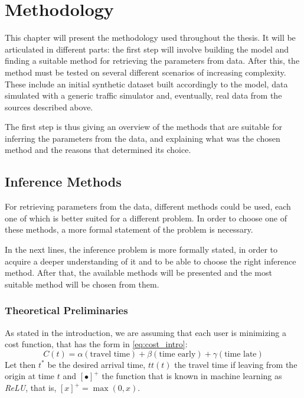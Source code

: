 \chapter{Methodology}
\label{chap:methodology}

This chapter will present the methodology used throughout the thesis.
It will be articulated in different parts:
the first step will involve building the model
and finding a suitable method for retrieving the parameters from data.
After this, the method must be tested on several different scenarios of increasing complexity.
These include an initial synthetic dataset built accordingly to the model,
data simulated with a generic traffic simulator and, eventually,
real data from the sources described above.

The first step is thus giving an overview of the methods that are suitable for inferring the parameters from the data,
and explaining what was the chosen method and the reasons that determined its choice.

\section{Inference Methods}
\label{sec:inference}

For retrieving parameters from the data, different methods could be used,
each one of which is better suited for a different problem.
In order to choose one of these methods, a more formal statement of the problem is necessary.

In the next lines, the inference problem is more formally stated,
in order to acquire a deeper understanding of it and to be able to choose the right inference method.
After that, the available methods will be presented and the most suitable method will be chosen from them.

\subsection{Theoretical Preliminaries}
\label{sec:theo_pre}

As stated in the introduction, we are assuming that each user is minimizing a cost function,
that has the form in \eqref{eq:cost_intro}:
\begin{equation}
  \label{eq:cost_init_inf}
  C(t) = \alpha(\text{travel time}) + \beta (\text{time early}) + \gamma (\text{time late})
\end{equation}
Let then \(t^*\) be the desired arrival time,
\(tt(t)\) the travel time if leaving from the origin at time \(t\) and
\([\bullet]^+\) the function that is known in machine learning as \textit{ReLU}, that is,
\([x]^+ = \max(0, x)\).

